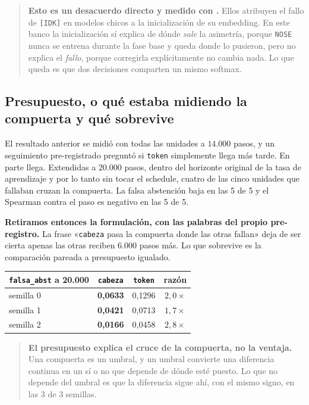 \documentclass[11pt,a4paper]{article}
\begin{document}
\begin{quote}
\textbf{Esto es un desacuerdo directo y medido con \citet{cohen2024idk}.} Ellos atribuyen el fallo de
\texttt{[IDK]} en modelos chicos a la inicialización de su embedding. En este banco la inicialización
sí explica de dónde \emph{sale} la asimetría, porque \texttt{NOSE} nunca se entrena durante la fase
base y queda donde lo pusieron, pero no explica el \emph{fallo}, porque corregirla explícitamente no
cambia nada. Lo que queda es que dos decisiones comparten un mismo softmax.
\end{quote}

\subsection{Presupuesto, o qué estaba midiendo la compuerta y qué sobrevive}
\label{sec:presupuesto}

El resultado anterior se midió con todas las unidades a $14{.}000$ pasos, y un seguimiento
pre-registrado preguntó si \texttt{token} simplemente llega más tarde. En parte llega. Extendidas a
$20{.}000$ pasos, dentro del horizonte original de la tasa de aprendizaje y por lo tanto sin tocar el
schedule, cuatro de las cinco unidades que fallaban cruzan la compuerta. La falsa abstención baja en
las 5 de 5 y el Spearman contra el paso es negativo en las 5 de 5.

\textbf{Retiramos entonces la formulación, con las palabras del propio pre-registro.} La frase
«\texttt{cabeza} pasa la compuerta donde las otras fallan» deja de ser cierta apenas las otras reciben
$6{.}000$ pasos más. Lo que sobrevive es la comparación pareada a presupuesto igualado.

\begin{center}
\begin{tabular}{lccc}
\toprule
\texttt{falsa\_abst} a 20{.}000 & \texttt{cabeza} & \texttt{token} & razón \\
\midrule
semilla 0 & \textbf{0,0633} & 0,1296 & $2{,}0\times$ \\
semilla 1 & \textbf{0,0421} & 0,0713 & $1{,}7\times$ \\
semilla 2 & \textbf{0,0166} & 0,0458 & $2{,}8\times$ \\
\bottomrule
\end{tabular}
\end{center}

\begin{quote}
\textbf{El presupuesto explica el cruce de la compuerta, no la ventaja.} Una compuerta es un umbral,
y un umbral convierte una diferencia continua en un sí o no que depende de dónde esté puesto. Lo que
no depende del umbral es que la diferencia sigue ahí, con el mismo signo, en las 3 de 3 semillas.
\end{quote}
\end{document}
